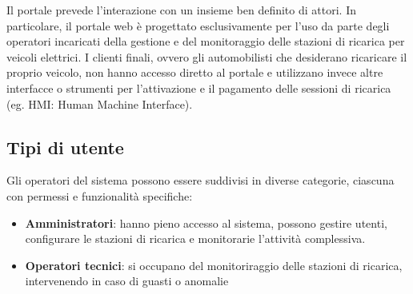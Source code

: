 
Il portale prevede l'interazione con un insieme ben definito di attori. In particolare, il portale web è progettato esclusivamente per l'uso da parte degli operatori incaricati della gestione e del monitoraggio delle stazioni di ricarica per veicoli elettrici. I clienti finali, ovvero gli automobilisti che desiderano ricaricare il proprio veicolo, non hanno accesso diretto al portale e utilizzano invece altre interfacce o strumenti per l'attivazione e il pagamento delle sessioni di ricarica (eg. HMI: Human Machine Interface).

\subsection{Tipi di utente}
Gli operatori del sistema possono essere suddivisi in diverse categorie, ciascuna con permessi e funzionalità specifiche:
\begin{itemize}
\item \textbf{Amministratori}: hanno pieno accesso al sistema, possono gestire utenti, configurare le stazioni di ricarica e monitorarie l'attività complessiva.
\item \textbf{Operatori tecnici}: si occupano del monitoriraggio delle stazioni di ricarica, intervenendo in caso di guasti o anomalie
\end{itemize}

